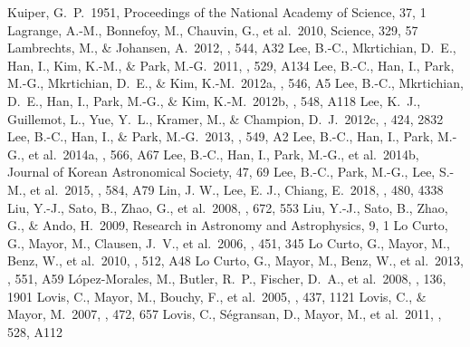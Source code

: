 \documentclass[twocolumn]{aastex62}
\begin{document}
\begin{CJK*}{UTF8}{min}
\begin{thebibliography}{}
 Kuiper, G.~P.\ 1951, Proceedings of the National Academy of Science, 37, 1
 Lagrange, A.-M., Bonnefoy, M., Chauvin, G., et al.\ 2010, Science, 329, 57
 Lambrechts, M., \& Johansen, A.\ 2012, \aap, 544, A32
 Lee, B.-C., Mkrtichian, D.~E., Han, I., Kim, K.-M., \& Park, M.-G.\ 2011, \aap, 529, A134
 Lee, B.-C., Han, I., Park, M.-G., Mkrtichian, D.~E., \& Kim, K.-M.\ 2012a, \aap, 546, A5
 Lee, B.-C., Mkrtichian, D.~E., Han, I., Park, M.-G., \& Kim, K.-M.\ 2012b, \aap, 548, A118
 Lee, K.~J., Guillemot, L., Yue, Y.~L., Kramer, M., \& Champion, D.~J.\ 2012c, \mnras, 424, 2832
 Lee, B.-C., Han, I., \& Park, M.-G.\ 2013, \aap, 549, A2
 Lee, B.-C., Han, I., Park, M.-G., et al.\ 2014a, \aap, 566, A67
 Lee, B.-C., Han, I., Park, M.-G., et al.\ 2014b, Journal of Korean Astronomical Society, 47, 69
 Lee, B.-C., Park, M.-G., Lee, S.-M., et al.\ 2015, \aap, 584, A79
 Lin, J. W., Lee, E. J., Chiang, E.\ 2018, \mnras, 480, 4338
 Liu, Y.-J., Sato, B., Zhao, G., et al.\ 2008, \apj, 672, 553
 Liu, Y.-J., Sato, B., Zhao, G., \& Ando, H.\ 2009, Research in Astronomy and Astrophysics, 9, 1
 Lo Curto, G., Mayor, M., Clausen, J.~V., et al.\ 2006, \aap, 451, 345
 Lo Curto, G., Mayor, M., Benz, W., et al.\ 2010, \aap, 512, A48
 Lo Curto, G., Mayor, M., Benz, W., et al.\ 2013, \aap, 551, A59
 L{\'o}pez-Morales, M., Butler, R.~P., Fischer, D.~A., et al.\ 2008, \aj, 136, 1901
 Lovis, C., Mayor, M., Bouchy, F., et al.\ 2005, \aap, 437, 1121
 Lovis, C., \& Mayor, M.\ 2007, \aap, 472, 657
 Lovis, C., S{\'e}gransan, D., Mayor, M., et al.\ 2011, \aap, 528, A112

\end{thebibliography}
\end{CJK*}
\end{document}
